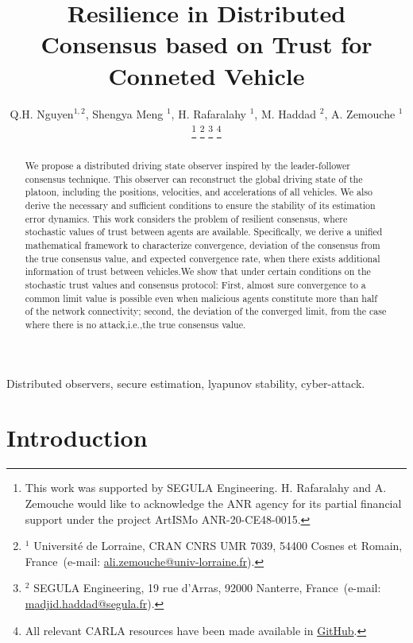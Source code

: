 \documentclass[letterpaper, 10pt, conference]{ieeeconf}  %
\begin{document}
\title{\bf Resilience in Distributed
 Consensus based on Trust for Conneted Vehicle }
\author{Q.H. Nguyen$^{1,2}$, Shengya Meng $^{1}$, H. Rafaralahy $^{1}$, M. Haddad $^{2}$, A. Zemouche $^{1}$
%
\thanks{This work was supported by SEGULA Engineering. H. Rafaralahy and A. Zemouche would like to acknowledge the ANR agency for its partial financial support under the project ArtISMo ANR-20-CE48-0015.
}
%
\thanks{$^{1}$ Universit\'e de Lorraine, CRAN  CNRS UMR 7039, 54400 Cosnes et Romain, France~(e-mail: \protect\url{ali.zemouche@univ-lorraine.fr}).}
%
\thanks{$^{2}$ SEGULA Engineering, 19 rue d'Arras, 92000 Nanterre, France~(e-mail: \protect\url{madjid.haddad@segula.fr}).}
%
\thanks{All relevant CARLA resources have been made available in \protect\href{https://github.com/kslhuy/CACC_UIO_simulink}{GitHub}.}
}
\maketitle

\begin{abstract}

 We propose a distributed driving state observer inspired by the leader-follower consensus technique. This observer can reconstruct the global driving state of the platoon, including the positions, velocities, and accelerations of all vehicles. We also derive the necessary and sufficient conditions to ensure the stability of its estimation error dynamics.
This work considers the problem of resilient consensus, where stochastic values of trust between agents are available. Specifically, we derive a unified mathematical framework to characterize convergence, deviation of the consensus from the true consensus value, and expected convergence rate, when there exists additional information of trust between vehicles.We show that under certain conditions on the stochastic trust values and consensus protocol: First, almost sure convergence to a common limit value is
possible even when malicious agents constitute more than half of the network connectivity; second, the deviation of the converged limit,
from the case where there is no attack,i.e.,the true consensus value.
\end{abstract}

\begin{keywords}
Distributed observers, secure estimation, lyapunov stability, cyber-attack.
\end{keywords}

\section{Introduction}
\end{document}
